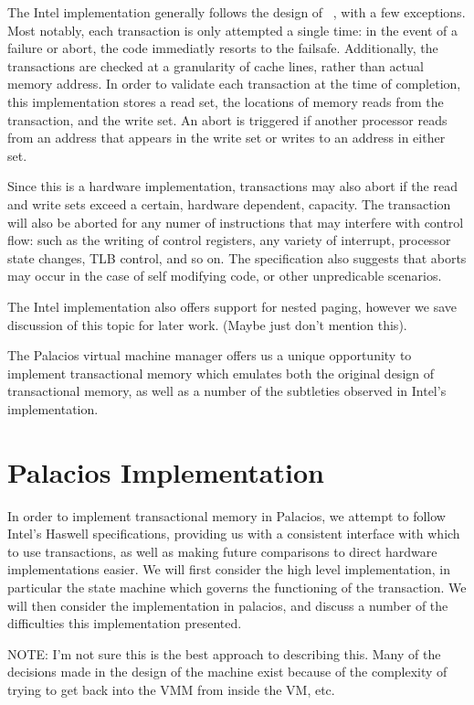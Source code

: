 \documentclass{acm_proc_article-sp}
\begin{document}
The Intel implementation generally follows the design of 
~\cite{Herlihy:1993:TMA:173682.165164}, with a few exceptions.
Most notably, each transaction is only attempted a single time: in the event
of a failure or abort, the code immediatly resorts to the failsafe. 
Additionally, the transactions are checked at a granularity of cache lines, 
rather than actual memory address. In order to validate each transaction at the
time of completion, this implementation stores a read set, the locations of
memory reads from the transaction, and the write set. An abort is triggered
if another processor reads from an address that appears in the write set or 
writes to an address in either set.

Since this is a hardware implementation, transactions may also abort if the 
read and write sets exceed a certain, hardware dependent, capacity. The 
transaction will also be aborted for any numer of instructions that may 
interfere with control flow: such as the writing of control registers, any 
variety of interrupt, processor state changes, TLB control, and so on. The 
specification also suggests that aborts may occur in the case of self modifying
code, or other unpredicable scenarios.

The Intel implementation also offers support for nested paging, however we
save discussion of this topic for later work. (Maybe just don't mention this). 

The Palacios virtual machine manager offers us a unique opportunity to
implement transactional memory which emulates both the original design of
transactional memory, as well as a number of the subtleties observed in 
Intel's implementation.

\section{Palacios Implementation}
In order to implement transactional memory in Palacios, we attempt to follow 
Intel's Haswell specifications, providing us with a consistent interface with which
to use transactions, as well as making future comparisons to direct hardware
implementations easier. We will first consider the high level implementation,
in particular the state machine which governs the functioning of the
transaction. We will then consider the implementation in palacios, and discuss 
a number of the difficulties this implementation presented.  

NOTE: I'm not sure this is the best approach to describing this. Many of the 
decisions made in the design of the machine exist because of the complexity of
trying to get back into the VMM from inside the VM, etc. 
\end{document}
